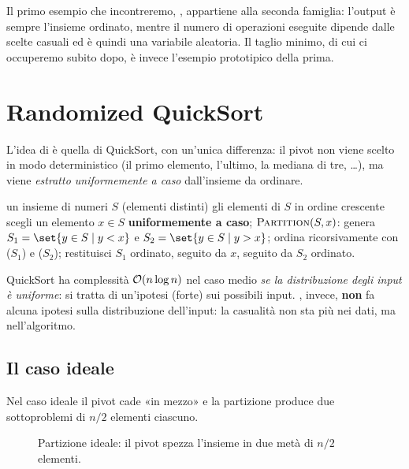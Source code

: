 Il primo esempio che incontreremo, \RandQS, appartiene alla seconda famiglia:
l'output è sempre l'insieme ordinato, mentre il numero di operazioni eseguite
dipende dalle scelte casuali ed è quindi una variabile aleatoria. Il taglio
minimo, di cui ci occuperemo subito dopo, è invece l'esempio prototipico della
prima.

\section{Randomized QuickSort}
\label{sec:randqs}

L'idea di \RandQS è quella di QuickSort, con un'unica differenza: il pivot non
viene scelto in modo deterministico (il primo elemento, l'ultimo, la mediana di
tre, \dots), ma viene \emph{estratto uniformemente a caso} dall'insieme da
ordinare.

\begin{algorithm}[H]
\caption{\RandQS}
\begin{algorithmic}[1]
\Require un insieme di numeri $S$ (elementi distinti)
\Ensure gli elementi di $S$ in ordine crescente
\State scegli un elemento $x \in S$ \textbf{uniformemente a caso};
\State $\textsc{Partition}(S,x)$: genera $S_1=\set{y\in S \mid y<x}$ e
       $S_2=\set{y\in S \mid y>x}$;
\State ordina ricorsivamente con \RandQS{}($S_1$) e \RandQS{}($S_2$); restituisci
       $S_1$ ordinato, seguito da $x$, seguito da $S_2$ ordinato.
\end{algorithmic}
\end{algorithm}

\begin{osservazione}
QuickSort ha complessità $\mathcal{O}(n\log n)$ nel caso medio \emph{se la distribuzione
degli input è uniforme}: si tratta di un'ipotesi (forte) sui possibili input.
\RandQS, invece, \textbf{non} fa alcuna ipotesi sulla distribuzione dell'input:
la casualità non sta più nei dati, ma nell'algoritmo.
\end{osservazione}

\subsection{Il caso ideale}
\label{sec:randqs-caso-ideale}

Nel caso ideale il pivot cade «in mezzo» e la partizione produce due
sottoproblemi di $n/2$ elementi ciascuno.

\begin{figure}[H]
  \centering
  
  \caption{Partizione ideale: il pivot spezza l'insieme in due metà di $n/2$
  elementi.}
  \label{fig:randqs-partizione}
\end{figure}

